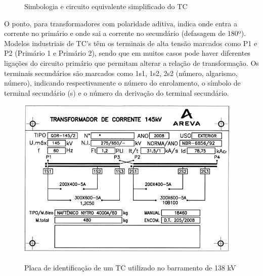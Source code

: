 \documentclass[a5paper,english,spanish,brazil]{ufsc-thesis}
\begin{document}
		\begin{figure}[htb]
		  \caption{Simbologia e circuito equivalente simplificado do TC}
		  \label{fig:tca}
		  \centering
		\end{figure}\par
		O ponto, para transformadores com polaridade aditiva, indica onde entra a corrente no primário e onde sai a corrente no secundário (defasagem de 180º). Modelos industriais de TC’s têm os terminais de alta tensão marcados como P1 e P2 (Primário 1 e Primário 2), sendo que em muitos casos pode haver diferentes ligações do circuito primário que permitam alterar a relação de transformação. Os terminais secundários são marcados como 1s1, 1s2, 2s2 (número, algarismo, número), indicando respectivamente o número do enrolamento, o símbolo de terminal secundário (s) e o número da derivação do terminal secundário.\par
		\begin{figure}[htb]
		  \caption{Placa de identificação de um TC utilizado no barramento de 138 kV}
		  \centering
		  \includegraphics[width=10.8cm]{placatc.jpg}
		  \label{fig:placatc}
		\end{figure}
\end{document}
